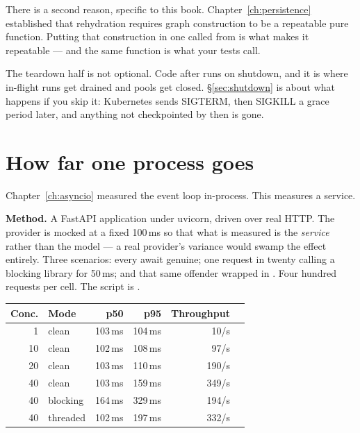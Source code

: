 There is a second reason, specific to this book. Chapter~\ref{ch:persistence}
established that rehydration requires graph construction to be a repeatable pure
function. Putting that construction in one  called from
 is what makes it repeatable --- and the same function is what
your tests call.

\begin{warning}
The teardown half is not optional. Code after  runs on shutdown, and
it is where in-flight runs get drained and pools get closed.
\S\ref{sec:shutdown} is about what happens if you skip it: Kubernetes sends
SIGTERM, then SIGKILL a grace period later, and anything not checkpointed by then
is gone.
\end{warning}

\section{How far one process goes}
\label{sec:measurement-service}

Chapter~\ref{ch:asyncio} measured the event loop in-process. This measures a
service.

\textbf{Method.} A FastAPI application under uvicorn, driven over real HTTP.
The provider is mocked at a fixed 100\,ms so that what is measured is the
\emph{service} rather than the model --- a real provider's variance would swamp
the effect entirely. Three scenarios: every await genuine; one request in twenty
calling a blocking library for 50\,ms; and that same offender wrapped in
. Four hundred requests per cell. The script is
.

\begin{center}
\small
\begin{tabularx}{\linewidth}{@{}rlrrrX@{}}
\toprule
\textbf{Conc.} & \textbf{Mode} & \textbf{p50} & \textbf{p95} & \textbf{Throughput} \\
\midrule
1 & clean & 103\,ms & 104\,ms & 10/s \\
10 & clean & 102\,ms & 108\,ms & 97/s \\
20 & clean & 103\,ms & 110\,ms & 190/s \\
40 & clean & 103\,ms & 159\,ms & 349/s \\
\midrule
40 & blocking & 164\,ms & 329\,ms & 194/s \\
40 & threaded & 102\,ms & 197\,ms & 332/s \\
\bottomrule
\end{tabularx}
\end{center}

